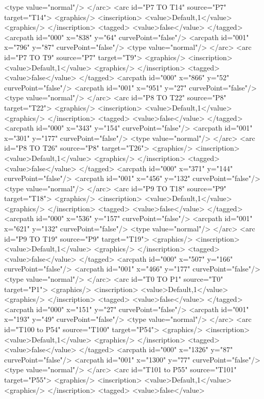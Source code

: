 <type value="normal"/>
</arc>
<arc id="P7 TO T14" source="P7" target="T14">
<graphics/>
<inscription>
<value>Default,1</value>
<graphics/>
</inscription>
<tagged>
<value>false</value>
</tagged>
<arcpath id="000" x="838" y="64" curvePoint="false"/>
<arcpath id="001" x="796" y="87" curvePoint="false"/>
<type value="normal"/>
</arc>
<arc id="P7 TO T9" source="P7" target="T9">
<graphics/>
<inscription>
<value>Default,1</value>
<graphics/>
</inscription>
<tagged>
<value>false</value>
</tagged>
<arcpath id="000" x="866" y="52" curvePoint="false"/>
<arcpath id="001" x="951" y="27" curvePoint="false"/>
<type value="normal"/>
</arc>
<arc id="P8 TO T22" source="P8" target="T22">
<graphics/>
<inscription>
<value>Default,1</value>
<graphics/>
</inscription>
<tagged>
<value>false</value>
</tagged>
<arcpath id="000" x="343" y="154" curvePoint="false"/>
<arcpath id="001" x="301" y="177" curvePoint="false"/>
<type value="normal"/>
</arc>
<arc id="P8 TO T26" source="P8" target="T26">
<graphics/>
<inscription>
<value>Default,1</value>
<graphics/>
</inscription>
<tagged>
<value>false</value>
</tagged>
<arcpath id="000" x="371" y="144" curvePoint="false"/>
<arcpath id="001" x="456" y="132" curvePoint="false"/>
<type value="normal"/>
</arc>
<arc id="P9 TO T18" source="P9" target="T18">
<graphics/>
<inscription>
<value>Default,1</value>
<graphics/>
</inscription>
<tagged>
<value>false</value>
</tagged>
<arcpath id="000" x="536" y="157" curvePoint="false"/>
<arcpath id="001" x="621" y="132" curvePoint="false"/>
<type value="normal"/>
</arc>
<arc id="P9 TO T19" source="P9" target="T19">
<graphics/>
<inscription>
<value>Default,1</value>
<graphics/>
</inscription>
<tagged>
<value>false</value>
</tagged>
<arcpath id="000" x="507" y="166" curvePoint="false"/>
<arcpath id="001" x="466" y="177" curvePoint="false"/>
<type value="normal"/>
</arc>
<arc id="T0 TO P1" source="T0" target="P1">
<graphics/>
<inscription>
<value>Default,1</value>
<graphics/>
</inscription>
<tagged>
<value>false</value>
</tagged>
<arcpath id="000" x="151" y="27" curvePoint="false"/>
<arcpath id="001" x="193" y="49" curvePoint="false"/>
<type value="normal"/>
</arc>
<arc id="T100 to P54" source="T100" target="P54">
<graphics/>
<inscription>
<value>Default,1</value>
<graphics/>
</inscription>
<tagged>
<value>false</value>
</tagged>
<arcpath id="000" x="1326" y="87" curvePoint="false"/>
<arcpath id="001" x="1300" y="77" curvePoint="false"/>
<type value="normal"/>
</arc>
<arc id="T101 to P55" source="T101" target="P55">
<graphics/>
<inscription>
<value>Default,1</value>
<graphics/>
</inscription>
<tagged>
<value>false</value>

